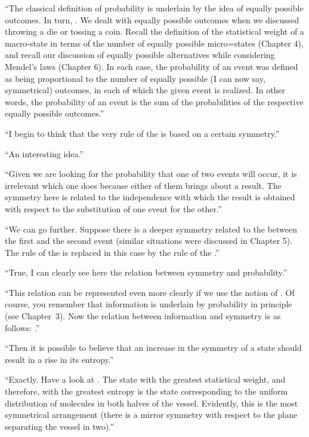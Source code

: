 \begin{dialogue}
\athr ``The classical definition of probability is underlain by the
idea of equally possible outcomes. In turn, . We dealt with equally possible
outcomes when we discussed throwing a die or tossing a coin. Recall
the definition of the statistical weight of a macro-state in terms of the
number of equally possible micro=states (Chapter 4), and recall our
discussion of equally possible alternatives while considering Mendel's
laws (Chapter 6). In each case, the probability of an event was defined as being proportional to the number of equally possible (I can now say, symmetrical) outcomes, in each of which the given event is realized. In other words, the probability of an event is the sum of the probabilities of the respective equally possible outcomes.''

\rdr ``I begin to think that the very rule of the  is based on a certain symmetry.''

\athr ``An interesting idea.''

\rdr ``Given we are looking for the probability that one of two
events will occur, it is irrelevant which one does because either of
them brings about a result. The symmetry here is related to the
independence with which the result is obtained with respect to the
substitution of one event for the other.''

\athr ``We can go further. Suppose there is a deeper symmetry
related to the  between the first and the second
event (similar situations were discussed in Chapter 5). The rule of the
 is replaced in this case by the rule of the
.''

\rdr ``True, I can clearly see here the relation between symmetry
and probability.''

\athr ``This relation can be represented even more clearly if we
use the notion of . Of course, you remember that
information is underlain by probability in principle (see Chapter~3).
Now the relation between information and symmetry is as follows:
.''

\rdr ``Then it is possible to believe that an increase in the
symmetry of a state should result in a rise in its entropy.''

\athr ``Exactly. Have a look at . The state with the
greatest statistical weight, and therefore, with the greatest entropy is
the state corresponding to the uniform distribution of molecules in
both halves of the vessel. Evidently, this is the most symmetrical
arrangement (there is a mirror symmetry with respect to the plane
separating the vessel in two).''


\end{dialogue}
